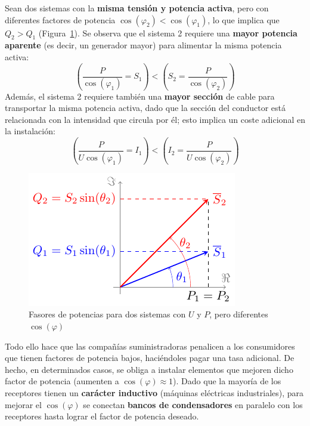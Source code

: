 Sean dos sistemas con la \textbf{misma tensión y potencia activa},
pero con diferentes factores de potencia
$\cos(\varphi_2) < \cos(\varphi_1)$, lo que implica que $Q_2 > Q_1$
(Figura~\ref{fig:fasorescompensacionreactiva}). Se observa que el
sistema 2 requiere una \textbf{mayor potencia aparente} (es decir, un
generador mayor) para alimentar la misma potencia activa:
\begin{equation*}
  \left(\dfrac{P}{\cos(\varphi_1)} = S_1 \right) < \left( S_2 = \dfrac{P}{\cos (\varphi_2)}\right) 
\end{equation*}
Además, el sistema 2 requiere también una \textbf{mayor sección} de
cable para transportar la misma potencia activa, dado que la sección
del conductor está relacionada con la intensidad que circula por él;
esto implica un coste adicional en la instalación:
\begin{equation*}
  \left(\frac{P}{U \cos (\varphi_1)} = I_1 \right) < \left( I_2 = \frac{P}{U \cos (\varphi_2)}\right) 
\end{equation*}
\begin{figure}[H]
  \centering \includegraphics{../figs/fasorescompensacionreactiva.pdf}
  \caption{Fasores de potencias para dos sistemas con $U$ y $P$, pero
    diferentes $\cos(\varphi)$}
  \label{fig:fasorescompensacionreactiva}
\end{figure}
	
Todo ello hace que las compañías suministradoras penalicen a los
consumidores que tienen factores de potencia bajos, haciéndoles pagar
una tasa adicional. De hecho, en determinados casos, se obliga a
instalar elementos que mejoren dicho factor de potencia (aumenten a
$\cos(\varphi)\approx 1$). Dado que la mayoría de los receptores tienen
un \textbf{carácter inductivo} (máquinas eléctricas industriales),
para mejorar el $\cos(\varphi)$ se conectan \textbf{bancos de
  condensadores} en paralelo con los receptores hasta lograr el factor
de potencia deseado.
	
